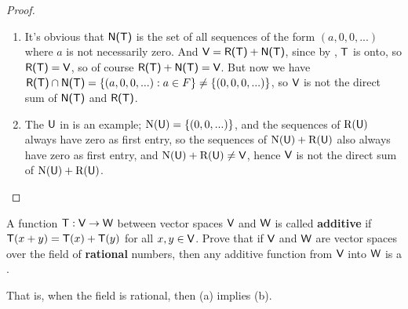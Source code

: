 \begin{proof} \ 
\begin{enumerate}
\item It's obvious that \(\textsf{N(T)}\) is the set of all sequences of the form \((a, 0, 0, ...)\) where \(a\) is not necessarily zero.
And \(\textsf{V} = \textsf{R(T)} + \textsf{N(T)}\), since by \EXEC{2.1.21}, \(\textsf{T}\) is onto, so \(\textsf{R(T)} = \textsf{V}\), so of course \(\textsf{R(T)} + \textsf{N(T)} = \textsf{V}\).
But now we have \(\textsf{R(T)} \cap \textsf{N(T)} = \{ (a, 0, 0, ...) : a \in F \} \ne \{ (0, 0, 0, ...) \}\),
so \(\textsf{V}\) is not the direct sum of \(\textsf{N(T)}\) and \(\textsf{R(T)}\).

\item The \(\textsf{U}\) in  is an example;
    \(\mathrm{N}(\textsf{U}) = \{ (0, 0, ...) \}\), and the sequences of \(\mathrm{R}(\textsf{U})\) always have zero as first entry,
    so the sequences of \(\mathrm{N}(\textsf{U}) + \mathrm{R}(\textsf{U})\) also always have zero as first entry, and \(\mathrm{N}(\textsf{U}) + \mathrm{R}(\textsf{U}) \ne \textsf{V}\),
    hence \(\textsf{V}\) is not the direct sum of \(\mathrm{N}(\textsf{U}) + \mathrm{R}(\textsf{U})\).
\end{enumerate}
\end{proof}

\begin{exercise} \label{exercise 2.1.38}
A function \(\textsf{T}: \textsf{V} \to \textsf{W}\) between vector spaces \(\textsf{V}\) and \(\textsf{W}\) is called \textbf{additive} if \(\textsf{T}(x + y) = \textsf{T}(x) + \textsf{T}(y)\) for all \(x, y \in \textsf{V}\).
Prove that if \(\textsf{V}\) and \(\textsf{W}\) are vector spaces over the field of \textbf{rational} numbers, then any additive
function from \(\textsf{V}\) into \(\textsf{W}\) is a \LTRAN{}.

That is, when the field is rational, then (a) implies (b).
\end{exercise}

